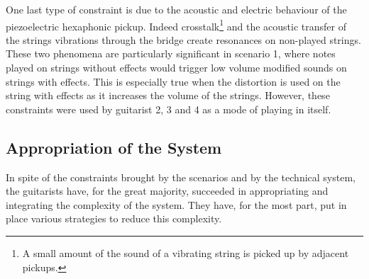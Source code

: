 \documentclass{article}
\begin{document}
One last type of constraint is due to the acoustic and electric behaviour of the piezoelectric hexaphonic pickup. Indeed crosstalk\footnote{A small amount of the sound of a vibrating string is picked up by adjacent pickups.} and  the acoustic transfer of the strings vibrations through the bridge create resonances on non-played strings. These two phenomena are particularly significant in scenario 1, where notes played on strings without effects would trigger low volume modified sounds on strings with effects. This is especially true when the distortion is used on the string with effects as it increases the volume of the strings.
However, these constraints were used by guitarist 2, 3 and 4 as a mode of playing in itself. 




\subsection{Appropriation of the System}

In spite of the constraints brought by the scenarios and by the technical system, the guitarists have, for the great majority, succeeded in appropriating and integrating the complexity of the system. They have, for the most part, put in place various strategies to reduce this complexity.
\end{document}
